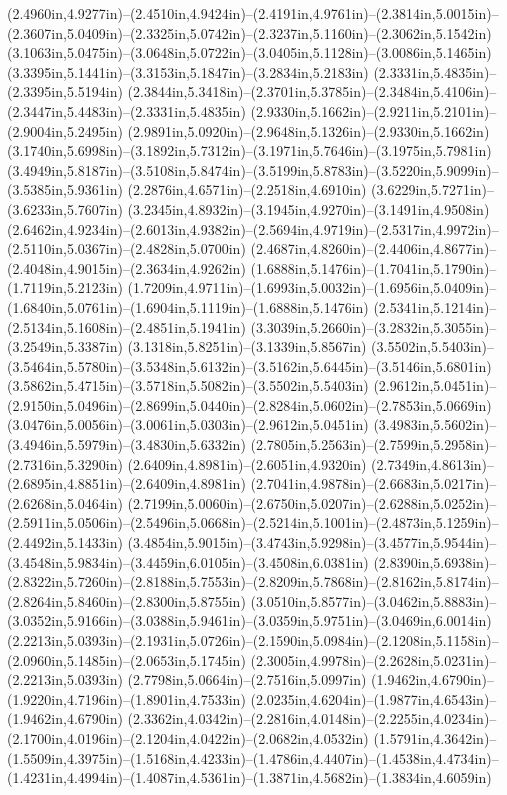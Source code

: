 (2.4960in,4.9277in)--(2.4510in,4.9424in)--(2.4191in,4.9761in)--(2.3814in,5.0015in)--(2.3607in,5.0409in)--(2.3325in,5.0742in)--(2.3237in,5.1160in)--(2.3062in,5.1542in) (3.1063in,5.0475in)--(3.0648in,5.0722in)--(3.0405in,5.1128in)--(3.0086in,5.1465in) (3.3395in,5.1441in)--(3.3153in,5.1847in)--(3.2834in,5.2183in) (2.3331in,5.4835in)--(2.3395in,5.5194in) (2.3844in,5.3418in)--(2.3701in,5.3785in)--(2.3484in,5.4106in)--(2.3447in,5.4483in)--(2.3331in,5.4835in) (2.9330in,5.1662in)--(2.9211in,5.2101in)--(2.9004in,5.2495in) (2.9891in,5.0920in)--(2.9648in,5.1326in)--(2.9330in,5.1662in) (3.1740in,5.6998in)--(3.1892in,5.7312in)--(3.1971in,5.7646in)--(3.1975in,5.7981in) (3.4949in,5.8187in)--(3.5108in,5.8474in)--(3.5199in,5.8783in)--(3.5220in,5.9099in)--(3.5385in,5.9361in) (2.2876in,4.6571in)--(2.2518in,4.6910in) (3.6229in,5.7271in)--(3.6233in,5.7607in) (3.2345in,4.8932in)--(3.1945in,4.9270in)--(3.1491in,4.9508in) (2.6462in,4.9234in)--(2.6013in,4.9382in)--(2.5694in,4.9719in)--(2.5317in,4.9972in)--(2.5110in,5.0367in)--(2.4828in,5.0700in) (2.4687in,4.8260in)--(2.4406in,4.8677in)--(2.4048in,4.9015in)--(2.3634in,4.9262in) (1.6888in,5.1476in)--(1.7041in,5.1790in)--(1.7119in,5.2123in) (1.7209in,4.9711in)--(1.6993in,5.0032in)--(1.6956in,5.0409in)--(1.6840in,5.0761in)--(1.6904in,5.1119in)--(1.6888in,5.1476in) (2.5341in,5.1214in)--(2.5134in,5.1608in)--(2.4851in,5.1941in) (3.3039in,5.2660in)--(3.2832in,5.3055in)--(3.2549in,5.3387in) (3.1318in,5.8251in)--(3.1339in,5.8567in) (3.5502in,5.5403in)--(3.5464in,5.5780in)--(3.5348in,5.6132in)--(3.5162in,5.6445in)--(3.5146in,5.6801in) (3.5862in,5.4715in)--(3.5718in,5.5082in)--(3.5502in,5.5403in) (2.9612in,5.0451in)--(2.9150in,5.0496in)--(2.8699in,5.0440in)--(2.8284in,5.0602in)--(2.7853in,5.0669in) (3.0476in,5.0056in)--(3.0061in,5.0303in)--(2.9612in,5.0451in) (3.4983in,5.5602in)--(3.4946in,5.5979in)--(3.4830in,5.6332in) (2.7805in,5.2563in)--(2.7599in,5.2958in)--(2.7316in,5.3290in) (2.6409in,4.8981in)--(2.6051in,4.9320in) (2.7349in,4.8613in)--(2.6895in,4.8851in)--(2.6409in,4.8981in) (2.7041in,4.9878in)--(2.6683in,5.0217in)--(2.6268in,5.0464in) (2.7199in,5.0060in)--(2.6750in,5.0207in)--(2.6288in,5.0252in)--(2.5911in,5.0506in)--(2.5496in,5.0668in)--(2.5214in,5.1001in)--(2.4873in,5.1259in)--(2.4492in,5.1433in) (3.4854in,5.9015in)--(3.4743in,5.9298in)--(3.4577in,5.9544in)--(3.4548in,5.9834in)--(3.4459in,6.0105in)--(3.4508in,6.0381in) (2.8390in,5.6938in)--(2.8322in,5.7260in)--(2.8188in,5.7553in)--(2.8209in,5.7868in)--(2.8162in,5.8174in)--(2.8264in,5.8460in)--(2.8300in,5.8755in) (3.0510in,5.8577in)--(3.0462in,5.8883in)--(3.0352in,5.9166in)--(3.0388in,5.9461in)--(3.0359in,5.9751in)--(3.0469in,6.0014in) (2.2213in,5.0393in)--(2.1931in,5.0726in)--(2.1590in,5.0984in)--(2.1208in,5.1158in)--(2.0960in,5.1485in)--(2.0653in,5.1745in) (2.3005in,4.9978in)--(2.2628in,5.0231in)--(2.2213in,5.0393in) (2.7798in,5.0664in)--(2.7516in,5.0997in) (1.9462in,4.6790in)--(1.9220in,4.7196in)--(1.8901in,4.7533in) (2.0235in,4.6204in)--(1.9877in,4.6543in)--(1.9462in,4.6790in) (2.3362in,4.0342in)--(2.2816in,4.0148in)--(2.2255in,4.0234in)--(2.1700in,4.0196in)--(2.1204in,4.0422in)--(2.0682in,4.0532in) (1.5791in,4.3642in)--(1.5509in,4.3975in)--(1.5168in,4.4233in)--(1.4786in,4.4407in)--(1.4538in,4.4734in)--(1.4231in,4.4994in)--(1.4087in,4.5361in)--(1.3871in,4.5682in)--(1.3834in,4.6059in) 